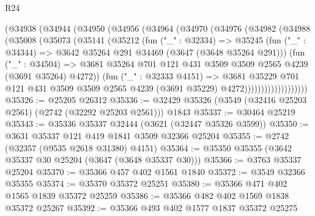 \begin{lexlean}{R24}
\begin{coremodule}
              (@34938
                (@34944
                  (@34950
                    (@34956
                      (@34964
                        (@34970
                          (@34976
                            (@34982
                              (@34988
                                (@35008
                                  (@35073
                                    (@35141
                                      (@35212
                                        (fun ("_" : @32334) =>
                                        @35245
                                          (fun ("_" : @34344) =>
                                          @3642 @35264 @291 @34469 (@3647 (@3648 @35264 @291)))
                                          (fun ("_" : @34504) =>
                                          @3681
                                            @35264
                                            @701
                                            @121
                                            @431
                                            @3509
                                            @3509
                                            @2565
                                            @4239
                                            (@3691 @35264)
                                            @4272))
                                        (fun ("_" : @32333 @4151) =>
                                        @3681
                                          @35229
                                          @701
                                          @121
                                          @431
                                          @3509
                                          @3509
                                          @2565
                                          @4239
                                          (@3691 @35229)
                                          @4272)))))))))))))))))))
@35326 := @25205 @26312
@35336 := @32429 @35326 (@3549 (@32416 @25203 @2561) (@2742 (@32292 @25203 @2561))) @1843
@35337 := @30464 @25219
@35343 := @35336 @35337 @32444 (@3621 (@32447 @35326 @3599))
@35350 := @3631 @35337 @121 @419 @1841 @3509 @32366 @25204
@35355 := @2742 (@32357 (@9535 @2618 @31380) @4151)
@35364 := @35350 @35355 (@3642 @35337 @30 @25204 (@3647 (@3648 @35337 @30)))
@35366 := @3763 @35337 @25204
@35370 := @35366 @457 @402 @1561 @1840
@35372 := @3549 @32366 @35355
@35374 := @35370 @35372 @25251
@35380 := @35366 @471 @402 @1565 @1839 @35372 @25259
@35386 := @35366 @482 @402 @1569 @1838 @35372 @25267
@35392 := @35366 @493 @402 @1577 @1837 @35372 @25275

\end{coremodule}
\end{lexlean}
